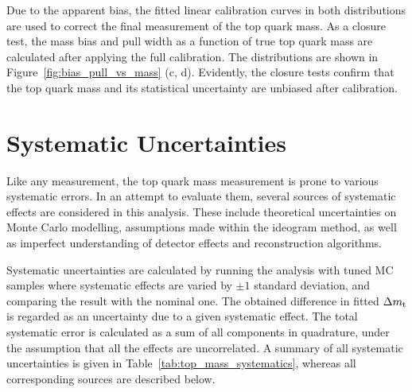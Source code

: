 Due to the apparent bias, the fitted linear calibration curves in both distributions are used to correct the final
measurement of the top quark mass. As a closure test, the mass bias and pull width as a function of true top quark mass
are calculated after applying the full calibration. The distributions are shown in Figure~\ref{fig:bias_pull_vs_mass}
(c, d). Evidently, the closure tests confirm that the top quark mass and its statistical uncertainty are unbiased after
calibration.

 

\section{Systematic Uncertainties}
\label{s_top_mass:systematics}

Like any measurement, the top quark mass measurement is prone to various systematic errors. In an attempt to evaluate
them, several sources of systematic effects are considered in this analysis. These include theoretical uncertainties on
Monte Carlo modelling, assumptions made within the ideogram method, as well as imperfect understanding of detector
effects and reconstruction algorithms.

Systematic uncertainties are calculated by running the analysis with tuned MC samples where systematic effects are
varied by $\pm 1$ standard deviation, and comparing the result with the nominal one. The obtained difference in fitted
$\Delta m_\mathrm{t}$ is regarded as an uncertainty due to a given systematic effect. The total systematic error is calculated
as a sum of all components in quadrature, under the assumption that all the effects are uncorrelated. A summary of all
systematic uncertainties is given in Table~\ref{tab:top_mass_systematics}, whereas all corresponding sources are
described below.



